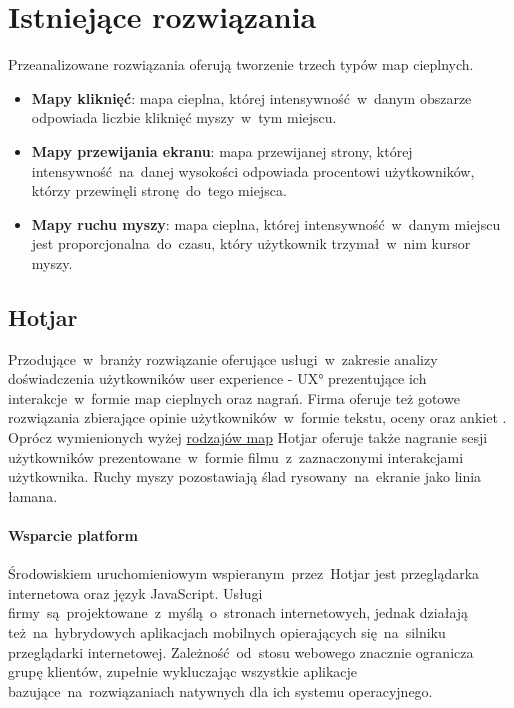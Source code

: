 \section{Istniejące rozwiązania}
\label{par:heat_map_types}

\noindent Przeanalizowane rozwiązania oferują tworzenie trzech typów map cieplnych.

\begin{itemize}
	\item {\bf Mapy kliknięć}: mapa cieplna, której intensywność~w~danym obszarze odpowiada liczbie kliknięć myszy~w~tym miejscu.
	\item {\bf Mapy przewijania ekranu}: mapa przewijanej strony, której intensywność~na~danej wysokości odpowiada procentowi użytkowników, którzy przewinęli stronę~do~tego miejsca.
	\item {\bf Mapy ruchu myszy}: mapa cieplna, której intensywność~w~danym miejscu jest proporcjonalna~do~czasu, który użytkownik trzymał~w~nim kursor myszy.
\end{itemize}

\subsection{Hotjar}
\label{sec:hotjar}
Przodujące~w~branży rozwiązanie oferujące usługi~w~zakresie analizy doświadczenia użytkowników \ang{user experience - UX} prezentujące ich interakcje~w~formie map cieplnych oraz nagrań. Firma oferuje też gotowe rozwiązania zbierające opinie użytkowników~w~formie tekstu, oceny oraz ankiet \cite{Hotjar_website}. Oprócz wymienionych wyżej \hyperref[{par:heat_map_types}]{rodzajów map} Hotjar oferuje także nagranie sesji użytkowników prezentowane~w~formie filmu~z~zaznaczonymi interakcjami użytkownika. Ruchy myszy pozostawiają ślad rysowany~na~ekranie jako linia łamana.

\paragraph{Wsparcie platform} 
Środowiskiem uruchomieniowym wspieranym~przez~Hotjar jest przeglądarka internetowa oraz język JavaScript. Usługi firmy~są~projektowane~z~myślą~o~stronach internetowych, jednak działają też~na~hybrydowych aplikacjach mobilnych opierających się~na~silniku przeglądarki internetowej. Zależność~od~stosu webowego znacznie ogranicza grupę klientów, zupełnie wykluczając wszystkie aplikacje bazujące~na~rozwiązaniach natywnych dla ich systemu operacyjnego.

